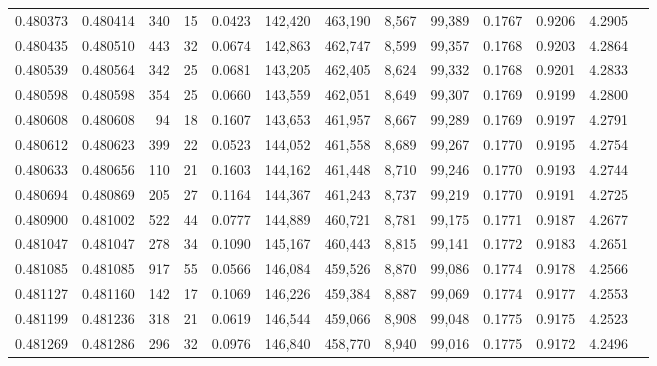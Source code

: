 \begin{tabular}{rrrrrrrrrrrrr}
0.480373 & 0.480414 &   340 &    15 &                                     0.0423 & 142,420 & 463,190 &   8,567 &  99,389 & 0.1767 & 0.9206 & 4.2905 \\
0.480435 & 0.480510 &   443 &    32 &                                     0.0674 & 142,863 & 462,747 &   8,599 &  99,357 & 0.1768 & 0.9203 & 4.2864 \\
0.480539 & 0.480564 &   342 &    25 &                                     0.0681 & 143,205 & 462,405 &   8,624 &  99,332 & 0.1768 & 0.9201 & 4.2833 \\
0.480598 & 0.480598 &   354 &    25 &                                     0.0660 & 143,559 & 462,051 &   8,649 &  99,307 & 0.1769 & 0.9199 & 4.2800 \\
0.480608 & 0.480608 &    94 &    18 &                                     0.1607 & 143,653 & 461,957 &   8,667 &  99,289 & 0.1769 & 0.9197 & 4.2791 \\
0.480612 & 0.480623 &   399 &    22 &                                     0.0523 & 144,052 & 461,558 &   8,689 &  99,267 & 0.1770 & 0.9195 & 4.2754 \\
0.480633 & 0.480656 &   110 &    21 &                                     0.1603 & 144,162 & 461,448 &   8,710 &  99,246 & 0.1770 & 0.9193 & 4.2744 \\
0.480694 & 0.480869 &   205 &    27 &                                     0.1164 & 144,367 & 461,243 &   8,737 &  99,219 & 0.1770 & 0.9191 & 4.2725 \\
0.480900 & 0.481002 &   522 &    44 &                                     0.0777 & 144,889 & 460,721 &   8,781 &  99,175 & 0.1771 & 0.9187 & 4.2677 \\
0.481047 & 0.481047 &   278 &    34 &                                     0.1090 & 145,167 & 460,443 &   8,815 &  99,141 & 0.1772 & 0.9183 & 4.2651 \\
0.481085 & 0.481085 &   917 &    55 &                                     0.0566 & 146,084 & 459,526 &   8,870 &  99,086 & 0.1774 & 0.9178 & 4.2566 \\
0.481127 & 0.481160 &   142 &    17 &                                     0.1069 & 146,226 & 459,384 &   8,887 &  99,069 & 0.1774 & 0.9177 & 4.2553 \\
0.481199 & 0.481236 &   318 &    21 &                                     0.0619 & 146,544 & 459,066 &   8,908 &  99,048 & 0.1775 & 0.9175 & 4.2523 \\
0.481269 & 0.481286 &   296 &    32 &                                     0.0976 & 146,840 & 458,770 &   8,940 &  99,016 & 0.1775 & 0.9172 & 4.2496 \\

\end{tabular}
